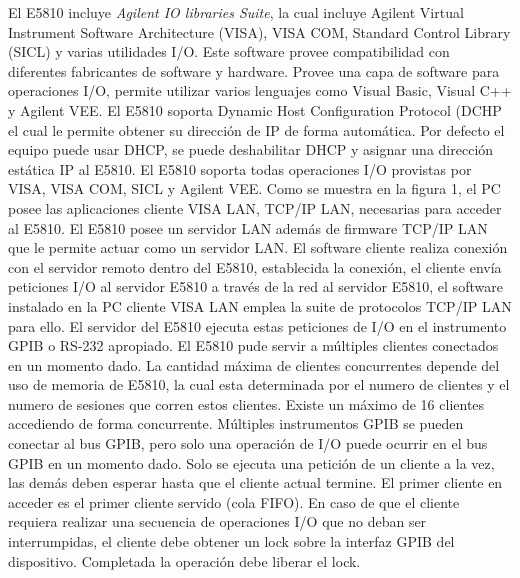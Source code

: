 El E5810 incluye \emph{Agilent IO libraries Suite}, la cual incluye Agilent Virtual Instrument Software Architecture (VISA), VISA COM, Standard Control Library (SICL) y varias utilidades I/O. Este software provee compatibilidad con diferentes fabricantes de software y hardware. Provee una capa de software para operaciones I/O, permite utilizar varios lenguajes como Visual Basic, Visual C++ y Agilent VEE.
El E5810 soporta Dynamic Host Configuration Protocol (DCHP el cual le permite obtener su dirección de IP de forma automática. Por defecto el equipo puede usar DHCP, se puede deshabilitar DHCP y asignar una dirección estática IP al E5810.
El E5810 soporta todas operaciones I/O provistas por VISA, VISA COM, SICL y Agilent VEE. 
Como se muestra en la figura 1, el PC posee las aplicaciones cliente VISA LAN, TCP/IP LAN, necesarias para acceder al E5810. El E5810 posee un servidor LAN además de firmware TCP/IP LAN que le permite actuar como un servidor LAN.
El software cliente realiza conexión con el servidor remoto dentro del E5810, establecida la conexión, el cliente envía peticiones I/O al servidor E5810 a través de la red al servidor E5810, el software instalado en la PC cliente VISA LAN emplea la suite de protocolos TCP/IP LAN para ello. El servidor del E5810 ejecuta estas peticiones de I/O en el instrumento GPIB o RS-232 apropiado.
El E5810 pude servir a múltiples clientes conectados en un momento dado. La cantidad máxima de clientes concurrentes depende del uso de memoria de E5810, la cual esta determinada por el numero de clientes y el numero de sesiones que corren estos clientes. Existe un máximo de 16 clientes accediendo de forma concurrente.
Múltiples instrumentos GPIB se pueden conectar al bus GPIB, pero solo una operación de I/O puede ocurrir en el bus GPIB en un momento dado. Solo se ejecuta una petición de un cliente a la vez, las demás deben esperar hasta que el cliente actual termine. El primer cliente en acceder es el primer cliente servido (cola FIFO).
En caso de que el cliente requiera realizar una secuencia de operaciones I/O que no deban ser interrumpidas, el cliente debe obtener un lock sobre la interfaz GPIB del dispositivo. Completada la operación debe liberar el lock.





